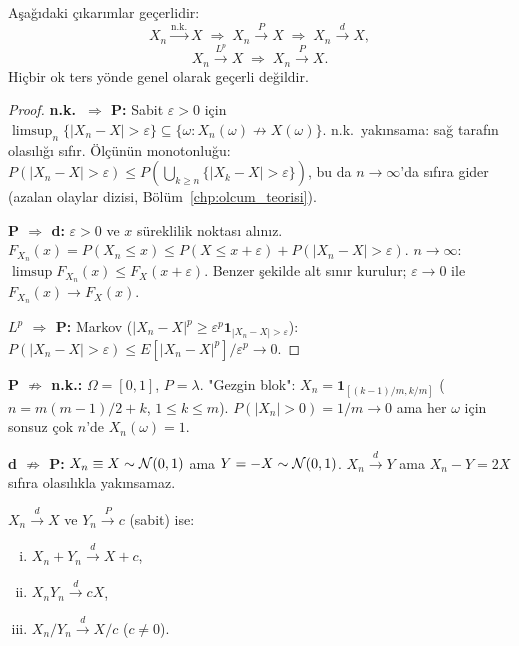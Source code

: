 \begin{teorem}
\label{thm:yaklinsama_hiyerarsi}
Aşağıdaki çıkarımlar geçerlidir:
\[
  X_n \xrightarrow{\text{n.k.}} X \;\Rightarrow\; X_n \xrightarrow{P} X \;\Rightarrow\; X_n \xrightarrow{d} X,
\]
\[
  X_n \xrightarrow{L^p} X \;\Rightarrow\; X_n \xrightarrow{P} X.
\]
Hiçbir ok ters yönde genel olarak geçerli değildir.
\end{teorem}

\begin{proof}
\textbf{n.k.\ $\Rightarrow$ P:} Sabit $\varepsilon > 0$ için
$\limsup_n \{|X_n - X| > \varepsilon\} \subseteq \{\omega : X_n(\omega) \not\to X(\omega)\}$.
n.k.\ yakınsama: sağ tarafın olasılığı sıfır. Ölçünün monotonluğu:
$P(|X_n-X| > \varepsilon) \leq P(\bigcup_{k\geq n}\{|X_k-X|>\varepsilon\})$,
bu da $n\to\infty$'da sıfıra gider (azalan olaylar dizisi, Bölüm~\ref{chp:olcum_teorisi}).

\textbf{P $\Rightarrow$ d:} $\varepsilon > 0$ ve $x$ süreklilik noktası alınız.
$F_{X_n}(x) = P(X_n \leq x) \leq P(X \leq x+\varepsilon) + P(|X_n - X| > \varepsilon)$.
$n\to\infty$: $\limsup F_{X_n}(x) \leq F_X(x+\varepsilon)$.
Benzer şekilde alt sınır kurulur; $\varepsilon\to 0$ ile $F_{X_n}(x) \to F_X(x)$.

\textbf{$L^p$ $\Rightarrow$ P:} Markov ($|X_n-X|^p \geq \varepsilon^p \mathbf{1}_{|X_n-X|>\varepsilon}$):
$P(|X_n-X|>\varepsilon) \leq E[|X_n-X|^p]/\varepsilon^p \to 0$.
\end{proof}

\begin{karsiornek}
\label{ex:yaklinsama_karsiornek}

\textbf{P $\not\Rightarrow$ n.k.:} $\Omega = [0,1]$, $P = \lambda$. "Gezgin blok":
$X_n = \mathbf{1}_{[(k-1)/m, k/m]}$ ($n = m(m-1)/2 + k$, $1 \leq k \leq m$).
$P(|X_n| > 0) = 1/m \to 0$ ama her $\omega$ için sonsuz çok $n$'de $X_n(\omega) = 1$.

\textbf{d $\not\Rightarrow$ P:} $X_n \equiv X \sim \mathcal{N}(0,1)$ ama $Y = -X \sim \mathcal{N}(0,1)$.
$X_n \xrightarrow{d} Y$ ama $X_n - Y = 2X$ sıfıra olasılıkla yakınsamaz.
\end{karsiornek}

\begin{teorem}
\label{thm:slutsky}
$X_n \xrightarrow{d} X$ ve $Y_n \xrightarrow{P} c$ (sabit) ise:
\begin{enumerate}[(i)]
  \item $X_n + Y_n \xrightarrow{d} X + c$,
  \item $X_n Y_n \xrightarrow{d} cX$,
  \item $X_n / Y_n \xrightarrow{d} X/c$ ($c \neq 0$).
\end{enumerate}
\end{teorem}

